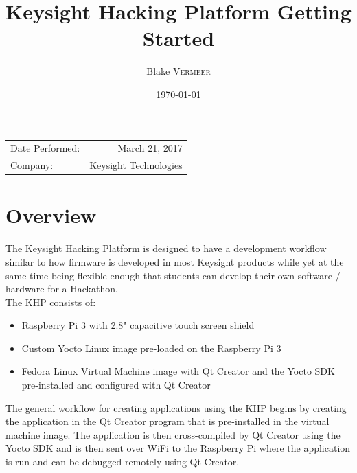 \documentclass{article}
\title{Keysight Hacking Platform Getting Started} %
\author{Blake \textsc{Vermeer}} %
\date{\today} %
\begin{document}
\maketitle %

\begin{center}
\begin{tabular}{l r}
Date Performed: & March 21, 2017 \\ %
Company: & Keysight Technologies %
\end{tabular}
\end{center}


\section{Overview}

The Keysight Hacking Platform is designed to have a development workflow similar to how firmware is developed in most Keysight products while yet at the same time being flexible enough that students can develop their own software / hardware for a Hackathon. \\

The KHP consists of:

	\begin{itemize}
		
		\item Raspberry Pi 3 with 2.8" capacitive touch screen shield
		
		\item Custom Yocto Linux image pre-loaded on the Raspberry Pi 3
		
		\item Fedora Linux Virtual Machine image with Qt Creator and the Yocto SDK pre-installed and configured with Qt Creator
		
	\end{itemize}

The general workflow for creating applications using the KHP begins by creating the application in the Qt Creator program that is pre-installed in the virtual machine image. The application is then cross-compiled by Qt Creator using the Yocto SDK and is then sent over WiFi to the Raspberry Pi where the application is run and can be debugged remotely using Qt Creator.
\end{document}

